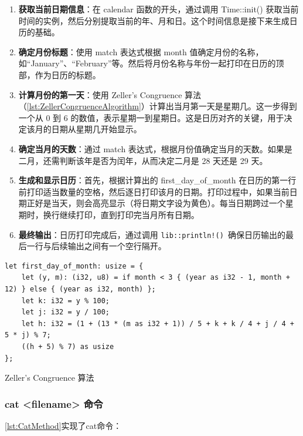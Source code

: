 \begin{enumerate}
    \item \textbf{获取当前日期信息}：在 calendar 函数的开头，通过调用 Time::init() 获取当前时间的实例，然后分别提取当前的年、月和日。这个时间信息是接下来生成日历的基础。
    \item \textbf{确定月份标题}：使用 match 表达式根据 month 值确定月份的名称，如“January”、“February”等。然后将月份名称与年份一起打印在日历的顶部，作为日历的标题。
    \item \textbf{计算月份的第一天}：使用 Zeller's Congruence 算法（\cref{lst:ZellerCongruenceAlgorithm}）计算出当月第一天是星期几。这一步得到一个从 0 到 6 的数值，表示星期一到星期日。这是日历对齐的关键，用于决定该月的日期从星期几开始显示。
    \item \textbf{确定当月的天数}：通过 match 表达式，根据月份值确定当月的天数。如果是二月，还需判断该年是否为闰年，从而决定二月是 28 天还是 29 天。
    \item \textbf{生成和显示日历}：首先，根据计算出的 first\_day\_of\_month 在日历的第一行前打印适当数量的空格，然后逐日打印该月的日期。打印过程中，如果当前日期正好是当天，则会高亮显示（将日期文字设为黄色）。每当日期跨过一个星期时，换行继续打印，直到打印完当月所有日期。
    \item \textbf{最终输出}：日历打印完成后，通过调用 \texttt{lib::println!() }确保日历输出的最后一行与后续输出之间有一个空行隔开。
\end{enumerate}

\begin{listing}[htbp]
    \begin{verbatim}
let first_day_of_month: usize = {
    let (y, m): (i32, u8) = if month < 3 { (year as i32 - 1, month + 12) } else { (year as i32, month) };
    let k: i32 = y % 100;
    let j: i32 = y / 100;
    let h: i32 = (1 + (13 * (m as i32 + 1)) / 5 + k + k / 4 + j / 4 + 5 * j) % 7;
    ((h + 5) % 7) as usize
};
    \end{verbatim}
    \caption{Zeller's Congruence 算法}\label{lst:ZellerCongruenceAlgorithm}
\end{listing}

\subsubsection{cat <filename> 命令}\label{sec:CatCommand}

\cref{lst:CatMethod}实现了cat命令：

